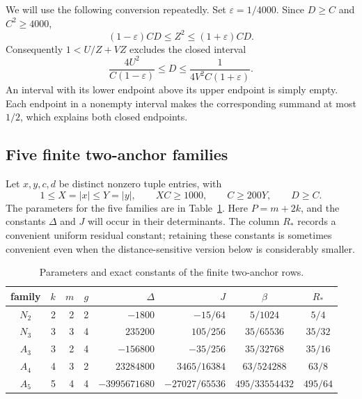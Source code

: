 \documentclass[12pt]{article}
\numberwithin{equation}{section}
\begin{document}
We will use the following conversion repeatedly. Set $\varepsilon=1/4000$.
Since $D\ge C$ and $C^2\ge4000$,
\begin{equation}\label{eq:ff-zcomparison}
 (1-\varepsilon)CD\le Z^2\le(1+\varepsilon)CD.
\end{equation}
Consequently $1<U/Z+VZ$ excludes the closed interval
\begin{equation}\label{eq:ff-window}
 \frac{4U^2}{C(1-\varepsilon)}\le D\le
 \frac{1}{4V^2C(1+\varepsilon)}.
\end{equation}
An interval with its lower endpoint above its upper endpoint is simply
empty. Each endpoint in a nonempty interval makes the corresponding
summand at most $1/2$, which explains both closed endpoints.

\subsection{Five finite two-anchor families}

Let $x,y,c,d$ be distinct nonzero tuple entries, with
\begin{equation}\label{eq:ff-twoguards}
 1\le X=|x|\le Y=|y|,\qquad XC\ge1000,
 \qquad C\ge200Y,\qquad D\ge C.
\end{equation}
The parameters for the five families are in Table~\ref{tab:ff-parameters}.
Here $P=m+2k$, and the constants $\Delta$ and $J$ will occur in their
determinants. The column $R_*$ records a convenient uniform residual
constant; retaining these constants is sometimes convenient even when
the distance-sensitive version below is considerably smaller.

\begin{table}[ht]\centering\small
\begin{tabular}{c|rrr|r|r|c|c}
 family&$k$&$m$&$g$&$\Delta$&$J$&$\beta$&$R_*$\\ \hline
 $N_2$&2&2&2&$-1800$&$-15/64$&$5/1024$&$5/4$\\
 $N_3$&3&3&4&$235200$&$105/256$&$35/65536$&$35/32$\\
 $A_3$&3&2&4&$-156800$&$-35/256$&$35/32768$&$35/16$\\
 $A_4$&4&3&2&$23284800$&$3465/16384$&$63/524288$&$63/8$\\
 $A_5$&5&4&4&$-3995671680$&$-27027/65536$&$495/33554432$&$495/64$
\end{tabular}
\caption{Parameters and exact constants of the finite two-anchor rows.}
\label{tab:ff-parameters}
\end{table}
\end{document}
